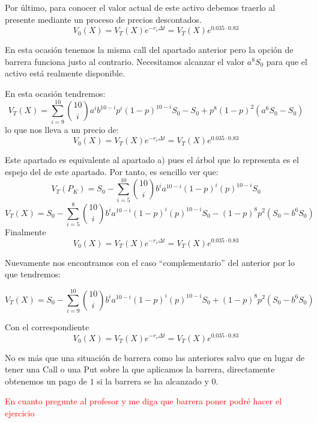 \begin{problem}[2]
Por último, para conocer el valor actual de este activo debemos traerlo al presente mediante un proceso de precios descontados.
\[V_0(X)=V_T(X)e^{-r_cΔt}=V_T(X)e^{0.035\cdot 0.83}\]

\spart

En esta ocasión tenemos la misma call del apartado anterior pero la opción de barrera funciona justo al contrario. Necesitamos alcanzar el valor $a^8S_0$ para que el activo está realmente disponible.

En esta ocasión tendremos:
\[V_T(X)=\sum_{i=9}^{10}{10 \choose i}a^{i}b^{10-i}p^i(1-p)^{10-i}S_0-S_0+p^8(1-p)^2(a^6S_0-S_0)\]
lo que nos lleva a un precio de:
\[V_0(X)=V_T(X)e^{-r_cΔt}=V_T(X)e^{0.035\cdot 0.83}\]

\spart

Este apartado es equivalente al apartado a) pues el árbol que lo representa es el espejo del de este apartado. Por tanto, es sencillo ver que:
\[V_T(P_K) = S_0 -\sum_{i=5}^{10}{10 \choose i}b^{i}a^{10-i}(1-p)^i(p)^{10-i}S_0\]
\[V_T(X) = S_0 -\sum_{i=5}^{8}{10 \choose i}b^{i}a^{10-i}(1-p)^i(p)^{10-i}S_0-(1-p)^8p^2(S_0-b^6S_0)\]
Finalmente
\[V_0(X)=V_T(X)e^{-r_cΔt}=V_T(X)e^{0.035\cdot 0.83}\]

\spart

Nuevamente nos encontramos con el caso ``complementario'' del anterior por lo que tendremos:

\[V_T(X) = S_0 -\sum_{i=9}^{10}{10 \choose i}b^{i}a^{10-i}(1-p)^i(p)^{10-i}S_0+(1-p)^8p^2(S_0-b^6S_0)\]

Con el correspondiente
\[V_0(X)=V_T(X)e^{-r_cΔt}=V_T(X)e^{0.035\cdot 0.83}\]

\spart

No es más que una situación de barrera como las anteriores salvo que en lugar de tener una Call o una Put sobre la que aplicamos la barrera, directamente obtenemos un pago de $1$ si la barrera se ha alcanzado y $0$.

\textcolor{red}{En cuanto pregunte al profesor y me diga que barrera poner podré hacer el ejercicio}

\end{problem}

